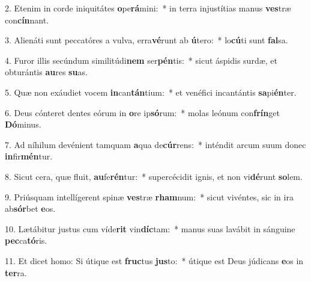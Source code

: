 2. Etenim in corde iniquitátes \textbf{o}pe\textbf{rá}mini:~*  in terra injustítias manus \textbf{ves}træ con\textbf{cín}nant.\

3. Alienáti sunt peccatóres a vulva, erra\textbf{vé}runt ab \textbf{ú}tero:~*  lo\textbf{cú}ti sunt \textbf{fal}sa.\

4. Furor illis secúndum similitúdi\textbf{nem} ser\textbf{pén}tis:~*  sicut áspidis surdæ, et obturántis \textbf{au}res \textbf{su}as.\

5. Quæ non exáudiet vocem \textbf{in}can\textbf{tán}tium:~*  et venéfici incantántis \textbf{sa}pi\textbf{én}ter.\

6. Deus cónteret dentes eórum in \textbf{o}re ip\textbf{só}rum:~*  molas leónum con\textbf{frín}get \textbf{Dó}minus.\

7. Ad níhilum devénient tamquam \textbf{a}qua de\textbf{cúr}rens:~*  inténdit arcum suum donec \textbf{in}fir\textbf{mén}tur.\

8. Sicut cera, quæ fluit, \textbf{au}fe\textbf{rén}tur:~*  supercécidit ignis, et non vi\textbf{dé}runt \textbf{so}lem.\

9. Priúsquam intellígerent spinæ \textbf{ves}træ \textbf{rham}num:~*  sicut vivéntes, sic in ira ab\textbf{sór}bet \textbf{e}os.\

10. Lætábitur justus cum víde\textbf{rit} vin\textbf{díc}tam:~*  manus suas lavábit in sánguine \textbf{pec}ca\textbf{tó}ris.\

11. Et dicet homo: Si útique est \textbf{fruc}tus \textbf{jus}to:~*  útique est Deus júdicans \textbf{e}os in \textbf{ter}ra.\


